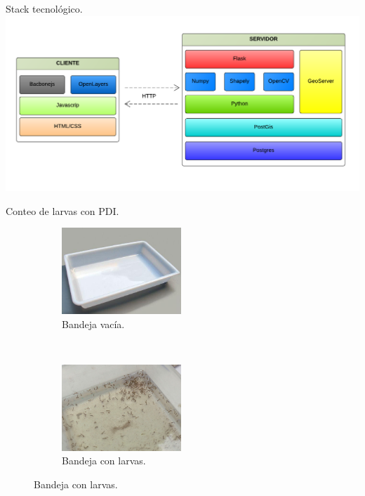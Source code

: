 \begin{frame}[c]{Stack tecnológico.}
\includegraphics[width=\textwidth]{../book/capitulo-5/graphics/stack-tecnologias.png}
\end{frame}

\begin{frame}[c]{Conteo de larvas con PDI.}
    \begin{figure}
    \begin{subfigure}[b]{0.45\textwidth}
        \includegraphics[width=4.5cm]{../book/capitulo-5/graphics/bandeja-muestra.jpg}
        \caption{Bandeja vacía.}
    \end{subfigure}
    ~~~~
    \begin{subfigure}[b]{0.45\textwidth}
        \includegraphics[width=4.5cm]{../book/capitulo-5/graphics/larvas-dengue.jpg}
        \caption{Bandeja con larvas.}
    \end{subfigure}
    \end{figure}
\end{frame}

